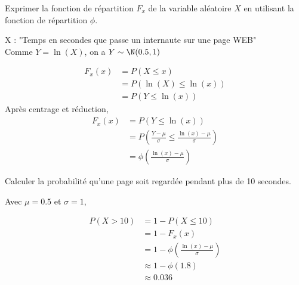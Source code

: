 \begin{exo}
	\begin{subexo}{Exprimer la fonction de répartition $F_x$ de la variable aléatoire $X$ en utilisant la fonction de répartition $\phi$.}
		\begin{center}
			X : "Temps en secondes que passe un internaute sur une page WEB" \\
			Comme $Y = \ln(X)$, on a $Y \sim \N(0.5,1)$
		\end{center}
		\begin{align*}
			F_x(x) &= P(X \leq x) \\
			&= P(\ln(X) \leq \ln(x)) \\
			&= P(Y \leq \ln(x))
		\end{align*}
	Après centrage et réduction,
		\begin{align*}
			F_x(x) &= P(Y \leq \ln(x)) \\
			&= P\left(\frac{Y-\mu}{\sigma} \leq \frac{\ln(x)-\mu}{\sigma}\right) \\
			&= \phi\left(\frac{\ln(x)-\mu}{\sigma}\right)
		\end{align*}
	\end{subexo}
	\begin{subexo}{Calculer la probabilité qu'une page soit regardée pendant plus de 10 secondes.}
		\begin{center}
			Avec $\mu = 0.5$ et $\sigma = 1$,
		\end{center}
		\begin{align*}
			P(X > 10) &= 1- P(X \leq 10) \\
			&= 1- F_x(x) \\
			&= 1 -\phi\left(\frac{\ln(x)-\mu}{\sigma}\right) \\
			&\approx 1 -\phi(1.8) \\
			&\approx 0.036
		\end{align*}
	\end{subexo}
\end{exo}
